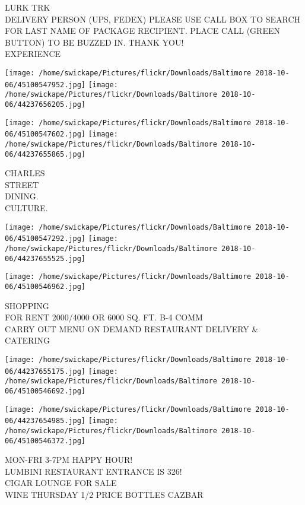 \documentclass[10pt,letterpaper]{article}
\begin{document}
LURK TRK\\
DELIVERY PERSON (UPS, FEDEX) PLEASE USE CALL BOX TO SEARCH FOR LAST NAME OF PACKAGE RECIPIENT.  PLACE CALL (GREEN BUTTON) TO BE BUZZED IN.  THANK YOU!\\
EXPERIENCE\\
\pagebreak

\texttt{[image: /home/swickape/Pictures/flickr/Downloads/Baltimore 2018-10-06/45100547952.jpg]}
\texttt{[image: /home/swickape/Pictures/flickr/Downloads/Baltimore 2018-10-06/44237656205.jpg]}

\texttt{[image: /home/swickape/Pictures/flickr/Downloads/Baltimore 2018-10-06/45100547602.jpg]}
\texttt{[image: /home/swickape/Pictures/flickr/Downloads/Baltimore 2018-10-06/44237655865.jpg]}

CHARLES\\
STREET\\
DINING.\\
CULTURE.\\
\pagebreak

\texttt{[image: /home/swickape/Pictures/flickr/Downloads/Baltimore 2018-10-06/45100547292.jpg]}
\texttt{[image: /home/swickape/Pictures/flickr/Downloads/Baltimore 2018-10-06/44237655525.jpg]}

\vspace{0.25in}
\texttt{[image: /home/swickape/Pictures/flickr/Downloads/Baltimore 2018-10-06/45100546962.jpg]}

SHOPPING\\
FOR RENT 2000/4000 OR 6000 SQ. FT. B{-}4 COMM\\
CARRY OUT MENU ON DEMAND RESTAURANT DELIVERY \& CATERING\\
\pagebreak

\texttt{[image: /home/swickape/Pictures/flickr/Downloads/Baltimore 2018-10-06/44237655175.jpg]}
\texttt{[image: /home/swickape/Pictures/flickr/Downloads/Baltimore 2018-10-06/45100546692.jpg]}

\texttt{[image: /home/swickape/Pictures/flickr/Downloads/Baltimore 2018-10-06/44237654985.jpg]}
\texttt{[image: /home/swickape/Pictures/flickr/Downloads/Baltimore 2018-10-06/45100546372.jpg]}

MON{-}FRI 3{-}7PM HAPPY HOUR!\\
LUMBINI RESTAURANT ENTRANCE IS 326!\\
CIGAR LOUNGE FOR SALE\\
WINE THURSDAY 1/2 PRICE BOTTLES CAZBAR\\
\pagebreak
\end{document}
